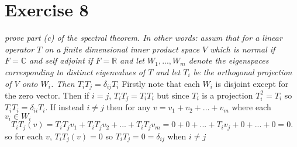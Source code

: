 \documentclass{article}
\begin{document}
        \section{Exercise 8}
        \emph{
            prove part (c) of the spectral theorem. In other words: assum that for a linear operator $T$ 
            on a finite dimensional inner product space $V$ which is normal if $F = \mathbb{C}$ 
            and self adjoint if $F = \mathbb{R}$ and let $W_1,...,W_m$ denote the eigenspaces
            corresponding to distinct eigenvalues of $T$ and let $T_i$ be the orthogonal projection
            of $V$ onto $W_i$. Then $T_iT_j = \delta_{ij}T_i$
        }
        Firstly note that each $W_i$ is disjoint except for the zero vector. Then if $i = j$, $T_iT_j = T_iT_i$ but since
        $T_i$ is a projection $T_i^2 = T_i$ so $T_iT_i = \delta_{ii}T_i$. If instead $i \ne j$ then for any $v = v_1 + v_2 +... + v_m$
        where each $v_i \in W_i$ 
         \[
        T_iT_j(v) = T_iT_jv_1 + T_iT_jv_2 + ... + T_iT_jv_m = 0 + 0 +... + T_iv_j + 0 +... + 0 = 0
        .\] 
        so for each $v$, $T_iT_j(v) = 0$ so $T_iT_j = 0 = \delta_{ij}$ when $i \ne j$
\end{document}
